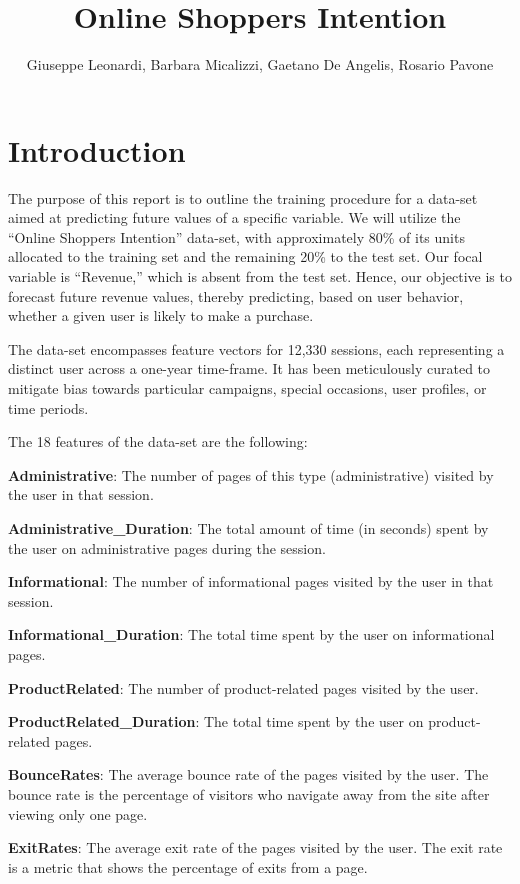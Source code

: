 \documentclass[
]{article}
\title{Online Shoppers Intention}
\author{Giuseppe Leonardi, Barbara Micalizzi, Gaetano De Angelis,
Rosario Pavone}
\date{}
\begin{document}
\maketitle

{
\setcounter{tocdepth}{4}
\tableofcontents
}
\newpage

\section{Introduction}\label{introduction}

The purpose of this report is to outline the training procedure for a
data-set aimed at predicting future values of a specific variable. We
will utilize the ``Online Shoppers Intention'' data-set, with
approximately 80\% of its units allocated to the training set and the
remaining 20\% to the test set. Our focal variable is ``Revenue,'' which
is absent from the test set. Hence, our objective is to forecast future
revenue values, thereby predicting, based on user behavior, whether a
given user is likely to make a purchase.

The data-set encompasses feature vectors for 12,330 sessions, each
representing a distinct user across a one-year time-frame. It has been
meticulously curated to mitigate bias towards particular campaigns,
special occasions, user profiles, or time periods.

The 18 features of the data-set are the following:

\textbf{Administrative}: The number of pages of this type
(administrative) visited by the user in that session.

\textbf{Administrative\_Duration}: The total amount of time (in seconds)
spent by the user on administrative pages during the session.

\textbf{Informational}: The number of informational pages visited by the
user in that session.

\textbf{Informational\_Duration}: The total time spent by the user on
informational pages.

\textbf{ProductRelated}: The number of product-related pages visited by
the user.

\textbf{ProductRelated\_Duration}: The total time spent by the user on
product-related pages.

\textbf{BounceRates}: The average bounce rate of the pages visited by
the user. The bounce rate is the percentage of visitors who navigate
away from the site after viewing only one page.

\textbf{ExitRates}: The average exit rate of the pages visited by the
user. The exit rate is a metric that shows the percentage of exits from
a page.
\end{document}
